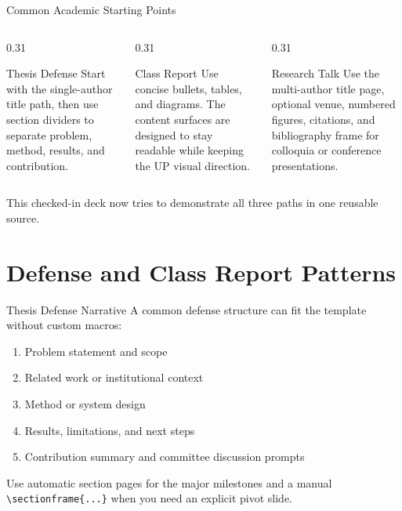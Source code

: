 \documentclass[aspectratio=169]{beamer}
\begin{document}
\begin{frame}{Common Academic Starting Points}
  \begin{columns}[T]
    \begin{column}{0.31\textwidth}
      \begin{exampleblock}{Thesis Defense}
        Start with the single-author title path, then use section dividers to separate
        problem, method, results, and contribution.
      \end{exampleblock}
    \end{column}
    \begin{column}{0.31\textwidth}
      \begin{alertblock}{Class Report}
        Use concise bullets, tables, and diagrams. The content surfaces are designed to
        stay readable while keeping the UP visual direction.
      \end{alertblock}
    \end{column}
    \begin{column}{0.31\textwidth}
      \begin{block}{Research Talk}
        Use the multi-author title page, optional venue, numbered figures, citations,
        and bibliography frame for colloquia or conference presentations.
      \end{block}
    \end{column}
  \end{columns}

  \vskip 8pt
  This checked-in deck now tries to demonstrate all three paths in one reusable source.
\end{frame}


\section{Defense and Class Report Patterns}

\begin{frame}{Thesis Defense Narrative}
  A common defense structure can fit the template without custom macros:

  \begin{enumerate}
    \item Problem statement and scope
    \item Related work or institutional context
    \item Method or system design
    \item Results, limitations, and next steps
    \item Contribution summary and committee discussion prompts
  \end{enumerate}

  \vskip 8pt
  Use automatic section pages for the major milestones and a manual
  \texttt{\textbackslash sectionframe\{...\}} when you need an explicit pivot slide.
\end{frame}
\end{document}

